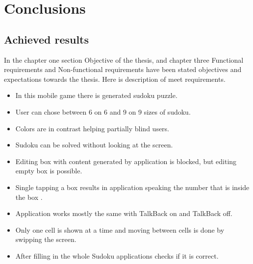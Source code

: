 \documentclass[a4paper,twoside,12pt]{book}
\begin{document}
\chapter{Conclusions}

\section{Achieved results}%

\par In the chapter one section Objective of the thesis, and chapter three Functional requirements and Non-functional requirements have been stated objectives and expectations towards the thesis. Here is description of meet requirements.
\begin{itemize}

\item In this mobile game there is generated sudoku puzzle.
\item User can chose between 6 on 6 and 9 on 9 sizes of sudoku.
\item Colors are in contrast helping partially blind users.
\item  Sudoku can be solved without looking at the screen.
\item Editing box with content generated by application is blocked, but editing empty box is possible.
\item Single tapping a box results in application speaking the number that is inside the box .
\item Application works mostly the same with TalkBack on and TalkBack off.
\item Only one cell is shown at a time and moving between cells is done by swipping the screen.
\item After filling in the whole Sudoku applications checks if it is correct.

\end{itemize}
\end{document}
